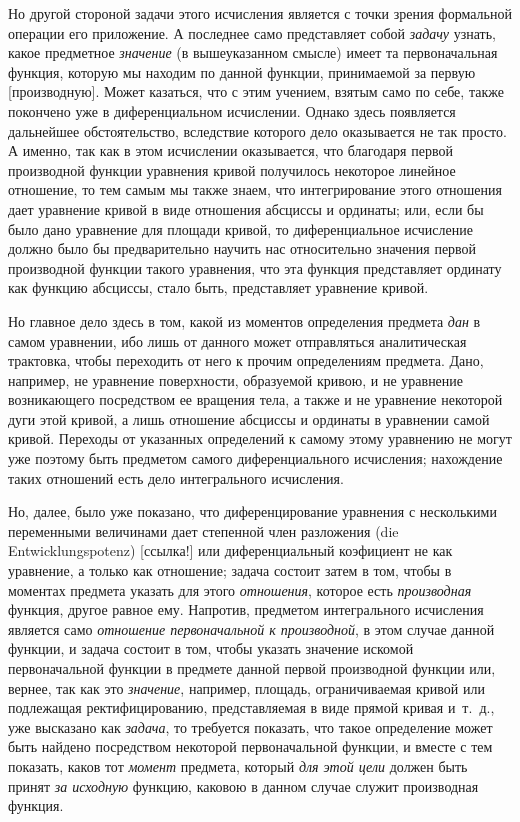 {Но другой стороной задачи этого исчисления является с точки зрения
формальной операции его приложение. А последнее само представляет собой
{\em задачу} узнать, какое предметное
{\em значение} (в вышеуказанном смысле) имеет та
первоначальная функция, которую мы находим по данной функции, принимаемой
за первую [производную]. Может казаться, что с этим учением, взятым само по
себе, также покончено уже в диференциальном исчислении. Однако здесь
появляется дальнейшее обстоятельство, вследствие которого дело оказывается
не так просто. А именно, так как в этом исчислении оказывается, что
благодаря первой производной функции уравнения кривой получилось некоторое
линейное отношение, то тем самым мы также знаем, что интегрирование этого
отношения дает уравнение кривой в виде отношения абсциссы и ординаты; или,
если бы было дано уравнение для площади кривой, то диференциальное
исчисление должно было бы предварительно научить нас относительно значения
первой производной функции такого уравнения, что эта функция представляет
ординату как функцию абсциссы, стало быть, представляет уравнение кривой.

Но главное дело здесь в том, какой из моментов определения предмета
{\em дан} в самом уравнении, ибо лишь от данного может
отправляться аналитическая трактовка, чтобы переходить от него к прочим
определениям предмета. Дано, например, не уравнение поверхности, образуемой
кривою, и не уравнение возникающего посредством ее вращения тела, а также и
не уравнение некоторой дуги этой кривой, а лишь отношение абсциссы и
ординаты в уравнении самой кривой. Переходы от указанных определений к
самому этому уравнению не могут уже поэтому быть предметом самого
диференциального исчисления; нахождение таких отношений есть дело
интегрального исчисления.

Но, далее, было уже показано, что диференцирование уравнения с несколькими
переменными величинами дает степенной член разложения (die
Entwicklungspotenz) [ссылка!] или диференциальный
коэфициент не как уравнение, а только как отношение; задача состоит затем в
том, чтобы в моментах предмета указать для этого
{\em отношения}, которое есть
{\em производная} функция, другое равное ему. Напротив,
предметом интегрального исчисления является само
{\em отношение первоначальной к производной}, в этом
случае данной функции, и задача состоит в том, чтобы указать значение
искомой первоначальной функции в предмете данной первой производной функции
или, вернее, так как это {\em значение}, например,
площадь, ограничиваемая кривой или подлежащая ректифицированию,
представляемая в виде прямой кривая и~т.~д., уже высказано как
{\em задача}, то требуется показать, что такое
определение может быть найдено посредством некоторой первоначальной
функции, и вместе с тем показать, каков тот
{\em момент} предмета, который
{\em для этой цели} должен быть принят
{\em за исходную} функцию, каковою в данном случае
служит производная функция.

}
